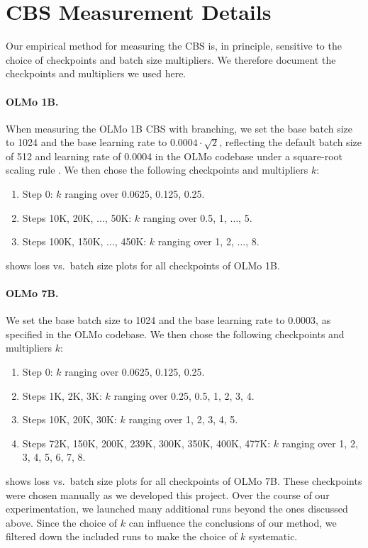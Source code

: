 \section{CBS Measurement Details} \label{sec:cbs-measurement-details}

Our empirical method for measuring the CBS  is, in principle, sensitive to the choice of checkpoints and batch size multipliers.
We therefore document the checkpoints and multipliers we used here.

\paragraph{OLMo 1B.}
When measuring the OLMo 1B CBS with branching, we set the base batch size to 1024 and the base learning rate to $0.0004 \cdot \sqrt{2}$, reflecting the default batch size of 512 and learning rate of 0.0004 in the OLMo codebase under a square-root scaling rule \citep{malladi2022sdes}.
We then chose the following checkpoints and multipliers $k$:
\begin{enumerate}
    \item Step 0: $k$ ranging over 0.0625, 0.125, 0.25.
    \item Steps 10K, 20K, $\ldots$, 50K: $k$ ranging over 0.5, 1, $\ldots$, 5.
    \item Steps 100K, 150K, $\dots$, 450K: $k$ ranging over 1, 2, $\ldots$, 8.
\end{enumerate}
 shows loss vs.~batch size plots for all checkpoints of OLMo 1B.

\paragraph{OLMo 7B.} We set the base batch size to 1024 and the base learning rate to $0.0003$, as specified in the OLMo codebase.
We then chose the following checkpoints and multipliers $k$:
\begin{enumerate}
    \item Step 0: $k$ ranging over 0.0625, 0.125, 0.25.
    \item Steps 1K, 2K, 3K: $k$ ranging over 0.25, 0.5, 1, 2, 3, 4.
    \item Steps 10K, 20K, 30K: $k$ ranging over 1, 2, 3, 4, 5.
    \item Steps 72K, 150K, 200K, 239K, 300K, 350K, 400K, 477K: $k$ ranging over 1, 2, 3, 4, 5, 6, 7, 8.
\end{enumerate}
 shows loss vs.~batch size plots for all checkpoints of OLMo 7B.
These checkpoints were chosen manually as we developed this project.
Over the course of our experimentation, we launched many additional runs beyond the ones discussed above.
Since the choice of $k$ can influence the conclusions of our method, we filtered down the included runs to make the choice of $k$ systematic.

